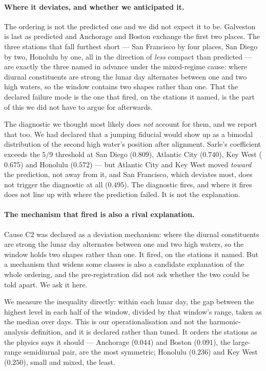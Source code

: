 \documentclass[10pt]{article}
\theoremstyle{plain}
\theoremstyle{definition}
\theoremstyle{remark}
\begin{document}
\paragraph{Where it deviates, and whether we anticipated it.}
The ordering is not the predicted one and we did not expect it to be. Galveston
is last as predicted and Anchorage and Boston exchange the first two places. The
three stations that fall furthest short --- San Francisco by four places, San
Diego by two, Honolulu by one, all in the direction of \emph{less} compact than
predicted --- are exactly the three named in advance under the mixed-regime
cause: where diurnal constituents are strong the lunar day alternates between
one and two high waters, so the window contains two shapes rather than one.
That the declared failure mode is the one that fired, on the stations it named,
is the part of this we did not have to argue for afterwards.

The diagnostic we thought most likely does \emph{not} account for them, and we
report that too. We had declared that a jumping fiducial would show up as a
bimodal distribution of the second high water's position after alignment.
Sarle's coefficient exceeds the $5/9$ threshold at San Diego ($0.809$),
Atlantic City ($0.740$), Key West ($0.675$) and Honolulu ($0.572$) --- but
Atlantic City and Key West moved \emph{toward} the prediction, not away from it,
and San Francisco, which deviates most, does not trigger the diagnostic at all
($0.495$). The diagnostic fires, and where it fires does not line up with where
the prediction failed. It is not the explanation.

\paragraph{The mechanism that fired is also a rival explanation.}
Cause C2 was declared as a deviation mechanism: where the diurnal constituents
are strong the lunar day alternates between one and two high waters, so the
window holds two shapes rather than one. It fired, on the stations it named.
But a mechanism that widens some classes is also a candidate explanation of the
whole ordering, and the pre-registration did not ask whether the two could be
told apart. We ask it here.

We measure the inequality directly: within each lunar day, the gap between the
highest level in each half of the window, divided by that window's range, taken
as the median over days. This is our operationalisation and not the
harmonic-analysis definition, and it is declared rather than tuned. It orders
the stations as the physics says it should --- Anchorage ($0.044$) and Boston
($0.091$), the large-range semidiurnal pair, are the most symmetric; Honolulu
($0.236$) and Key West ($0.250$), small and mixed, the least.
\end{document}
